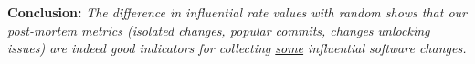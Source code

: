 {\bf Conclusion:}{\it 
The difference in influential rate values with random shows that our 
post-mortem metrics (isolated changes, popular commits, changes unlocking issues) are indeed 
good indicators for collecting \underline{some} influential software changes.
                }
